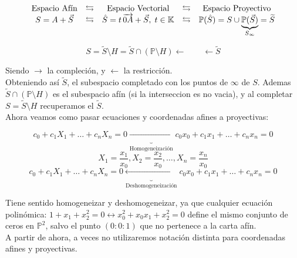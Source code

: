 \[
\begin{array}{c@{\quad\leftrightarrows\quad}c@{\quad\leftrightarrows\quad}c}
    \text{Espacio Afín} & \text{Espacio Vectorial} & \text{Espacio Proyectivo} \\
    S = A + \vec{S} & \hat{S} = t\,\overrightarrow{0A} + \vec{S},\; t \in \mathbb{K} & \mathbb{P}(\hat{S}) = S \cup \underbrace{\mathbb{P}(\vec{S})}_{S_{\infty}} = \widetilde{S}
\end{array}
\]


\[
S=\widetilde{S} \setminus H = \widetilde{S} \cap (\mathbb{P} \setminus H) 
\leftarrow \qquad \leftarrow 
\widetilde{S}
\]

Siendo $\rightarrow$ la compleción, y $\leftarrow$ la restricción.\\
Obteniendo así $\widetilde{S}$, el subespacio completado con los puntos de $\infty$ de $S$.
Ademas $\widetilde{S} \cap (\mathbb{P} \setminus H)$ es el subespacio afín (si la interseccion es no vacia), y al completar $S=\widetilde{S} \setminus H$ recuperamos el $\widetilde{S}$.\\

Ahora veamos como pasar ecuaciones y coordenadas afines a proyectivas:

\[
c_0 + c_1 X_1 + \ldots + c_n X_n = 0 
\underbrace{\longrightarrow}_{\text{Homogeneización}}
c_0 x_0 + c_1 x_1 + \ldots + c_n x_n = 0
\]
\[
X_1 = \frac{x_1}{x_0}, X_2 = \frac{x_2}{x_0}, \ldots, X_n = \frac{x_n}{x_0}
\]
\[
c_0 + c_1 X_1 + \ldots + c_n X_n = 0 
\underbrace{\longleftarrow}_{\text{Deshomogeneización}}
c_0 x_0 + c_1 x_1 + \ldots + c_n x_n = 0
\]

Tiene sentido homogeneizar y deshomogeneizar, ya que cualquier ecuación polinómica: $1 + x_1 + x_2^2 = 0 \leftrightarrow x_0^2 + x_0 x_1 + x_2^2 = 0$ define el mismo conjunto de ceros en $\mathbb{P}^2$, salvo el punto $(0:0:1)$ que no pertenece a la carta afín.\\

A partir de ahora, a veces no utilizaremos notación distinta para coordenadas afines y proyectivas.

